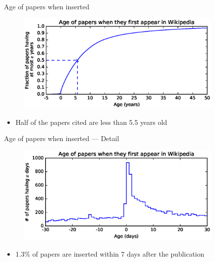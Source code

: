 \documentclass{beamer}
\begin{document}
\begin{frame}{Age of papers when inserted}
    \begin{figure}
    \centering
    \includegraphics[width=0.9\textwidth]{assets/age_of_papers_at_first_appearance_cdf_slides}
    \end{figure}
    \begin{itemize}
        \item Half of the papers cited are less than 5.5 years old
    \end{itemize}
\end{frame}

\begin{frame}{Age of papers when inserted --- Detail}
    \begin{figure}
    \centering
    \includegraphics[width=0.9\textwidth]{assets/age_of_papers_at_first_appearance_pdf_near0_slides}
    \end{figure}
    \centering
    \begin{itemize}
        \item 1.3\% of papers are inserted within 7 days after the publication
    \end{itemize}
\end{frame}
\end{document}
